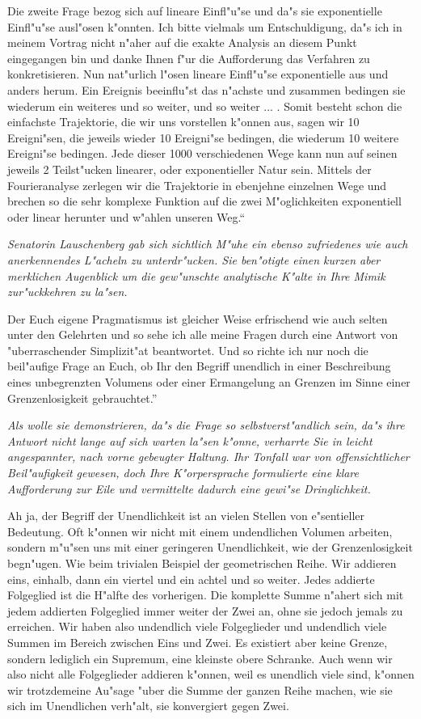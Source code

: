 \documentclass[a5paper,8pt]{book}
\begin{document}
Die zweite Frage bezog sich auf lineare Einfl"u"se und da"s sie exponentielle Einfl"u"se ausl"osen k"onnten. Ich bitte vielmals um Entschuldigung, da"s ich in meinem Vortrag nicht n"aher auf die exakte Analysis an diesem Punkt eingegangen bin und danke Ihnen f"ur die Aufforderung das Verfahren zu konkretisieren. Nun nat"urlich l"osen lineare Einfl"u"se exponentielle aus und anders herum. Ein Ereignis beeinflu"st das n"achste und zusammen bedingen sie wiederum ein weiteres und so weiter, und so weiter ... . Somit besteht schon die einfachste Trajektorie, die wir uns vorstellen k"onnen aus, sagen wir 10 Ereigni"sen, die jeweils wieder 10 Ereigni"se bedingen, die wiederum 10 weitere Ereigni"se bedingen. Jede dieser 1000 verschiedenen Wege kann nun auf seinen jeweils 2 Teilst"ucken linearer, oder exponentieller Natur sein. Mittels der Fourieranalyse zerlegen wir die Trajektorie in ebenjehne einzelnen Wege und brechen so die sehr komplexe Funktion auf die zwei M"oglichkeiten exponentiell oder linear herunter und 
w"ahlen unseren Weg.``

\textit{Senatorin Lauschenberg gab sich sichtlich M"uhe ein ebenso zufriedenes wie auch anerkennendes L"acheln zu unterdr"ucken. Sie ben"otigte einen kurzen aber merklichen Augenblick um die gew"unschte analytische K"alte in Ihre Mimik zur"uckkehren zu la"sen.}

\grqq Der Euch eigene Pragmatismus ist gleicher Weise erfrischend wie auch selten unter den Gelehrten und so sehe ich alle meine Fragen durch eine Antwort von "uberraschender Simplizit"at beantwortet.
Und so richte ich nur noch die beil"aufige Frage an Euch, ob Ihr den Begriff unendlich in einer Beschreibung eines unbegrenzten Volumens oder einer Ermangelung an Grenzen im Sinne einer Grenzenlosigkeit gebrauchtet.''

\textit{Als wolle sie demonstrieren, da"s die Frage so selbstverst"andlich sein, da"s ihre Antwort nicht lange auf sich warten la"sen k"onne, verharrte Sie in leicht angespannter, nach vorne gebeugter Haltung. Ihr Tonfall war von offensichtlicher Beil"aufigkeit gewesen, doch Ihre K"orpersprache formulierte eine klare Aufforderung zur Eile und vermittelte dadurch eine gewi"se Dringlichkeit. }

\grqq Ah ja, der Begriff der Unendlichkeit ist an vielen Stellen von e"sentieller Bedeutung. Oft k"onnen wir nicht mit einem undendlichen Volumen arbeiten, sondern m"u"sen uns mit einer geringeren Unendlichkeit, wie der Grenzenlosigkeit begn"ugen.
Wie beim trivialen Beispiel der geometrischen Reihe. Wir addieren eins, einhalb, dann ein viertel und ein achtel und so weiter. Jedes addierte Folgeglied ist die H"alfte des vorherigen. Die komplette Summe n"ahert sich mit jedem addierten Folgeglied immer weiter der Zwei an, ohne sie jedoch jemals zu erreichen. Wir haben also undendlich viele Folgeglieder und undendlich viele Summen im Bereich zwischen Eins und Zwei. Es existiert aber keine Grenze, sondern lediglich ein Supremum, eine kleinste obere Schranke.
Auch wenn wir also nicht alle Folgeglieder addieren k"onnen, weil es unendlich viele sind, k"onnen wir trotzdemeine Au"sage "uber die Summe der ganzen Reihe machen, wie sie sich im Unendlichen verh"alt, sie konvergiert gegen Zwei. \grqq
\end{document}
